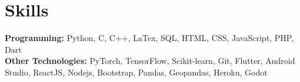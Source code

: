 \documentclass[]{Resume}
\begin{document}
\section{Skills} 
\hrulefill

\pt \textbf{Programming:} Python, C, C++, LaTex, SQL, HTML, CSS, JavaScript, PHP, Dart \\
\pt \textbf{Other Technologies:} PyTorch, TensorFlow, Scikit-learn, Git, Flutter, Android Studio, ReactJS, Nodejs, Bootstrap, Pandas, Geopandas, Heroku, Godot

\sectionsep




\end{document}
